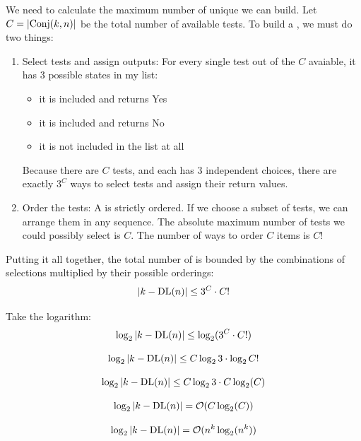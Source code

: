 We need to calculate the maximum number of unique  we can build. Let $C=\left\lvert\text{Conj}(k,n)\right\rvert$ be the total number of available tests. To build  a , we must do two things:
\begin{enumerate}
    \item Select tests and assign outputs: For every single test out of the $C$ avaiable, it has $3$ possible states in my list:
    \begin{itemize}
        \item it is included and returns Yes
        \item it is included and returns No
        \item it is not included in the list at all
    \end{itemize}
    Because there are $C$ tests, and each has $3$ independent choices, there are exactly $3^C$ ways to select tests and assign their return values.
    \item Order the tests: A  is strictly ordered. If we choose a subset of tests, we can arrange them in any sequence. The absolute maximum number of tests we could possibly select is $C$. The number of ways to order $C$ items is $C!$
\end{enumerate}

Putting it all together, the total number of  is bounded by the combinations of selections multiplied by their possible orderings:
\[
\left\lvert k-\text{DL}(n)\right\rvert \leq 3^C \cdot C!
\]

Take the logarithm:
\[
\log_2 \left\lvert k-\text{DL}(n)\right\rvert \leq \log_2 (3^C \cdot C!)
\]

\[
\log_2 \left\lvert k-\text{DL}(n)\right\rvert \leq C\log_2 3 \cdot \log_2 C!
\]


\[
\log_2 \left\lvert k-\text{DL}(n)\right\rvert \leq C\log_2 3 \cdot C \log_2(C)
\]



\[
\log_2 \left\lvert k-\text{DL}(n)\right\rvert = \mathcal{O}(C \log_2(C))
\]


\[
\log_2 \left\lvert k-\text{DL}(n)\right\rvert = \mathcal{O}(n^k \log_2(n^k))
\]

